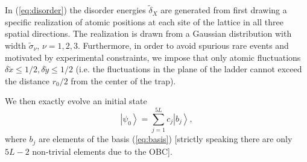 \documentclass[prl,aps,twocolumn,showpacs,superscriptaddress,longbibliography]{revtex4-1}
\newcommand{\ran}{\right\rangle}
\newcommand{\ket}[1]{\left| #1 \ran}
\begin{document}
In (\ref{eq:disorder}) the disorder energies $\tilde{\delta}_X$ are generated from first drawing a specific realization of atomic positions at each site of the lattice in all three spatial directions. The realization is drawn from a Gaussian distribution with width $\tilde{\sigma}_\nu$, $\nu=1,2,3$. Furthermore, in order to avoid spurious rare events and motivated by experimental constraints, we impose that only atomic fluctuations $\delta \tilde{x} \leq 1/2, \delta \tilde{y} \leq 1/2$ (i.e. the fluctuations in the plane of the ladder cannot exceed the distance $r_0/2$ from the center of the trap).

We then exactly evolve an initial state
\begin{equation}
	\ket{\psi_0} = \sum_{j=1}^{5L} c_j \ket{b_j},
\end{equation}
where $b_j$ are elements of the basis (\ref{eq:basis}) [strictly speaking there are only $5L-2$ non-trivial elements due to the OBC]. 







\end{document}
